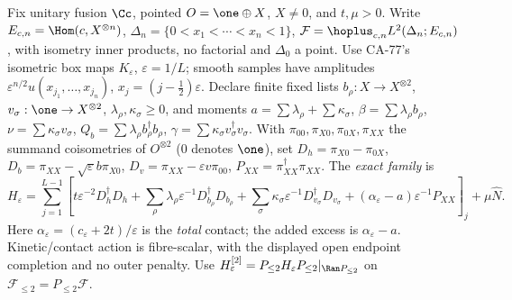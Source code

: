 Fix unitary fusion \(\Cc\), pointed \(O=\one\oplus X\), \(X\ne0\), and \(t,\mu>0\). Write
\(E_{c,n}=\Hom(c,X^{\otimes n})\), \(\Delta_n=\{0<x_1<\cdots<x_n<1\}\),
\(\mathcal F=\hoplus_{c,n}L^2(\Delta_n;E_{c,n})\), with isometry inner products, no factorial and \(\Delta_0\) a point.
Use CA-77's isometric box maps \(K_\varepsilon\), \(\varepsilon=1/L\); smooth samples have amplitudes
\(\varepsilon^{n/2}u(x_{j_1},\ldots,x_{j_n})\), \(x_j=(j-\tfrac12)\varepsilon\).
Declare finite fixed lists \(b_\rho:X\to X^{\otimes2}\), \(v_\sigma:\one\to X^{\otimes2}\),
\(\lambda_\rho,\kappa_\sigma\ge0\), and moments
\(a=\sum\lambda_\rho+\sum\kappa_\sigma\), \(\beta=\sum\lambda_\rho b_\rho\), \(\nu=\sum\kappa_\sigma v_\sigma\),
\(Q_b=\sum\lambda_\rho b_\rho^\dagger b_\rho\), \(\gamma=\sum\kappa_\sigma v_\sigma^\dagger v_\sigma\).
With \(\pi_{00},\pi_{X0},\pi_{0X},\pi_{XX}\) the summand coisometries of \(O^{\otimes2}\) (\(0\) denotes \(\one\)), set
\(D_h=\pi_{X0}-\pi_{0X}\), \(D_b=\pi_{XX}-\sqrt\varepsilon b\pi_{X0}\),
\(D_v=\pi_{XX}-\varepsilon v\pi_{00}\), \(P_{XX}=\pi_{XX}^\dagger\pi_{XX}\). The \emph{exact family} is
\begin{equation}\label{eq:99-family}
 H_\varepsilon=\sum_{j=1}^{L-1}\!\left[t\varepsilon^{-2}D_h^\dagger D_h+
 \sum_\rho\lambda_\rho\varepsilon^{-1}D_{b_\rho}^\dagger D_{b_\rho}+
 \sum_\sigma\kappa_\sigma\varepsilon^{-1}D_{v_\sigma}^\dagger D_{v_\sigma}
 +(\alpha_\varepsilon-a)\varepsilon^{-1}P_{XX}\right]_j+\mu\hat N .
\end{equation}
Here \(\alpha_\varepsilon=(c_\varepsilon+2t)/\varepsilon\) is the \emph{total} contact; the added excess is \(\alpha_\varepsilon-a\).
Kinetic/contact action is fibre-scalar, with the displayed open endpoint completion and no outer penalty.
Use \(H_\varepsilon^{[2]}=P_{\le2}H_\varepsilon P_{\le2}|_{\Ran P_{\le2}}\) on \(\mathcal F_{\le2}=P_{\le2}\mathcal F\).

